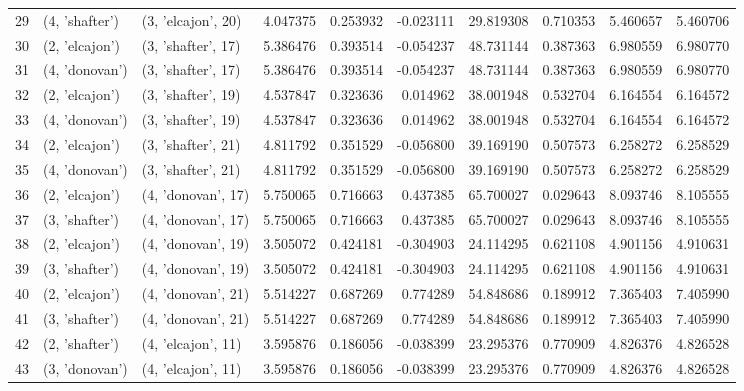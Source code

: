 \begin{tabular}{lllrrrrrrr}
29 &   (4, 'shafter') &  (3, 'elcajon', 20) &  4.047375 &   0.253932 & -0.023111 &   29.819308 &  0.710353 &   5.460657 &   5.460706 \\
30 &   (2, 'elcajon') &  (3, 'shafter', 17) &  5.386476 &   0.393514 & -0.054237 &   48.731144 &  0.387363 &   6.980559 &   6.980770 \\
31 &   (4, 'donovan') &  (3, 'shafter', 17) &  5.386476 &   0.393514 & -0.054237 &   48.731144 &  0.387363 &   6.980559 &   6.980770 \\
32 &   (2, 'elcajon') &  (3, 'shafter', 19) &  4.537847 &   0.323636 &  0.014962 &   38.001948 &  0.532704 &   6.164554 &   6.164572 \\
33 &   (4, 'donovan') &  (3, 'shafter', 19) &  4.537847 &   0.323636 &  0.014962 &   38.001948 &  0.532704 &   6.164554 &   6.164572 \\
34 &   (2, 'elcajon') &  (3, 'shafter', 21) &  4.811792 &   0.351529 & -0.056800 &   39.169190 &  0.507573 &   6.258272 &   6.258529 \\
35 &   (4, 'donovan') &  (3, 'shafter', 21) &  4.811792 &   0.351529 & -0.056800 &   39.169190 &  0.507573 &   6.258272 &   6.258529 \\
36 &   (2, 'elcajon') &  (4, 'donovan', 17) &  5.750065 &   0.716663 &  0.437385 &   65.700027 &  0.029643 &   8.093746 &   8.105555 \\
37 &   (3, 'shafter') &  (4, 'donovan', 17) &  5.750065 &   0.716663 &  0.437385 &   65.700027 &  0.029643 &   8.093746 &   8.105555 \\
38 &   (2, 'elcajon') &  (4, 'donovan', 19) &  3.505072 &   0.424181 & -0.304903 &   24.114295 &  0.621108 &   4.901156 &   4.910631 \\
39 &   (3, 'shafter') &  (4, 'donovan', 19) &  3.505072 &   0.424181 & -0.304903 &   24.114295 &  0.621108 &   4.901156 &   4.910631 \\
40 &   (2, 'elcajon') &  (4, 'donovan', 21) &  5.514227 &   0.687269 &  0.774289 &   54.848686 &  0.189912 &   7.365403 &   7.405990 \\
41 &   (3, 'shafter') &  (4, 'donovan', 21) &  5.514227 &   0.687269 &  0.774289 &   54.848686 &  0.189912 &   7.365403 &   7.405990 \\
42 &   (2, 'shafter') &  (4, 'elcajon', 11) &  3.595876 &   0.186056 & -0.038399 &   23.295376 &  0.770909 &   4.826376 &   4.826528 \\
43 &   (3, 'donovan') &  (4, 'elcajon', 11) &  3.595876 &   0.186056 & -0.038399 &   23.295376 &  0.770909 &   4.826376 &   4.826528 \\

\end{tabular}
